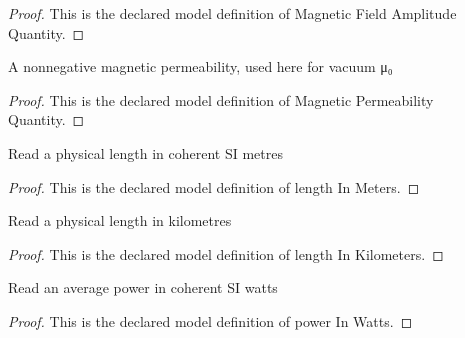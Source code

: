 \begin{proof}
  This is the declared model definition of Magnetic Field Amplitude Quantity.
\end{proof}
\begin{definition}
  \label{def:physics:phyx-mini-0944:phyxminiproblems-problemphyxmini0944-magneticpermeabilityquantity}
  A nonnegative magnetic permeability, used here for vacuum μ₀
\end{definition}
\begin{proof}
  This is the declared model definition of Magnetic Permeability Quantity.
\end{proof}
\begin{definition}
  \label{def:physics:phyx-mini-0944:phyxminiproblems-problemphyxmini0944-lengthinmeters}
  Read a physical length in coherent SI metres
\end{definition}
\begin{proof}
  This is the declared model definition of length In Meters.
\end{proof}
\begin{definition}
  \label{def:physics:phyx-mini-0944:phyxminiproblems-problemphyxmini0944-lengthinkilometers}
  Read a physical length in kilometres
\end{definition}
\begin{proof}
  This is the declared model definition of length In Kilometers.
\end{proof}
\begin{definition}
  \label{def:physics:phyx-mini-0944:phyxminiproblems-problemphyxmini0944-powerinwatts}
  Read an average power in coherent SI watts
\end{definition}
\begin{proof}
  This is the declared model definition of power In Watts.
\end{proof}
